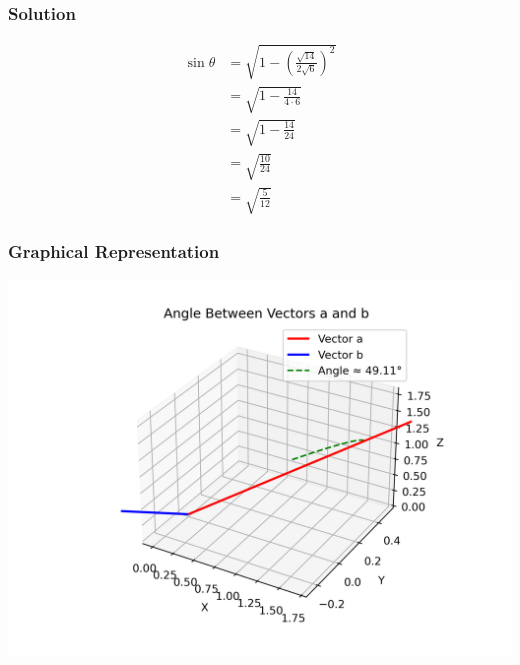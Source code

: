 \documentclass{beamer}
\begin{document}
\begin{frame}
\frametitle{Solution}

\begin{align}
\sin\theta &= \sqrt{1 - \left(\frac{\sqrt{14}}{2\sqrt{6}}\right)^2} \\
&= \sqrt{1 - \frac{14}{4 \cdot 6}} \\
&= \sqrt{1 - \frac{14}{24}} \\
&= \sqrt{\frac{10}{24}} \\
&= \sqrt{\frac{5}{12}}
\end{align}

\end{frame}


\begin{frame}
\frametitle{Graphical Representation}
\begin{center}
\includegraphics[width=0.8\linewidth]{fig1.png}
\end{center}
\end{frame}
\end{document}

